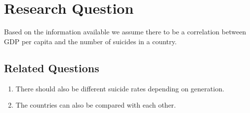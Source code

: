 \section*{Research Question}

Based on the information available we assume there to be a correlation between GDP per capita and the number of suicides in a country.

\subsection*{Related Questions}

\begin{enumerate}
    \item There should also be different suicide rates depending on generation.
    \item The countries can also be compared with each other.
\end{enumerate}
